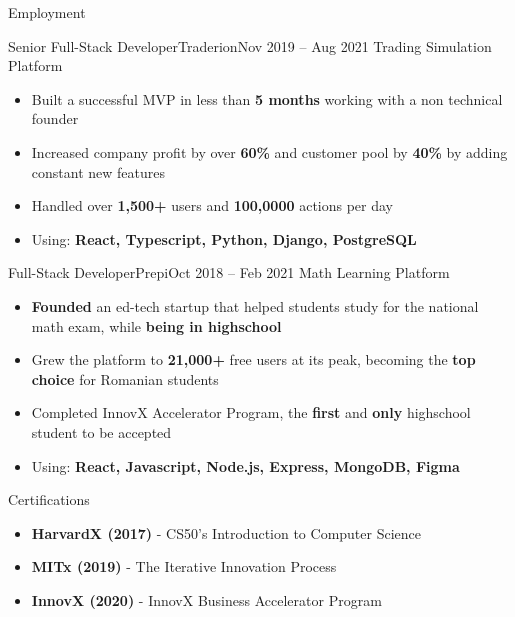 \documentclass[]{mcdowellcv}
\begin{document}
\begin{cvsection}{Employment}
		\begin{cvsubsection}{Senior Full-Stack Developer}{Traderion}{Nov 2019 -- Aug 2021}
			Trading Simulation Platform
			\begin{itemize}
				\item Built a successful MVP in less than \textbf{5 months} working with a non technical founder
				\item Increased company profit by over \textbf{60\%} and customer pool by \textbf{40\%} by adding constant new features
				\item Handled over \textbf{1,500+} users and \textbf{100,0000} actions per day
				\item Using: \textbf{React, Typescript, Python, Django, PostgreSQL}
			\end{itemize}
		\end{cvsubsection}
		
		\begin{cvsubsection}{Full-Stack Developer}{Prepi}{Oct 2018 -- Feb 2021}
			Math Learning Platform
			\begin{itemize}
				\item \textbf{Founded} an ed-tech startup that helped students study for the national math exam, while \textbf{being in highschool}
				\item Grew the platform to \textbf{21,000+} free users at its peak, becoming the \textbf{top choice} for Romanian students
				\item Completed InnovX Accelerator Program, the \textbf{first} and \textbf{only} highschool student to be accepted
				\item Using: \textbf{React, Javascript, Node.js, Express, MongoDB, Figma}
			\end{itemize}
		\end{cvsubsection}
	\end{cvsection}
	
	\begin{cvsection}{Certifications}
		\begin{cvsubsection}{}{}{}	
			\begin{itemize}
				\item \textbf{HarvardX (2017)} - CS50's Introduction to Computer Science
				\item \textbf{MITx (2019)} - The Iterative Innovation Process
				\item \textbf{InnovX (2020)} - InnovX Business Accelerator Program
			\end{itemize}
		\end{cvsubsection}
	\end{cvsection}
	
\end{document}
